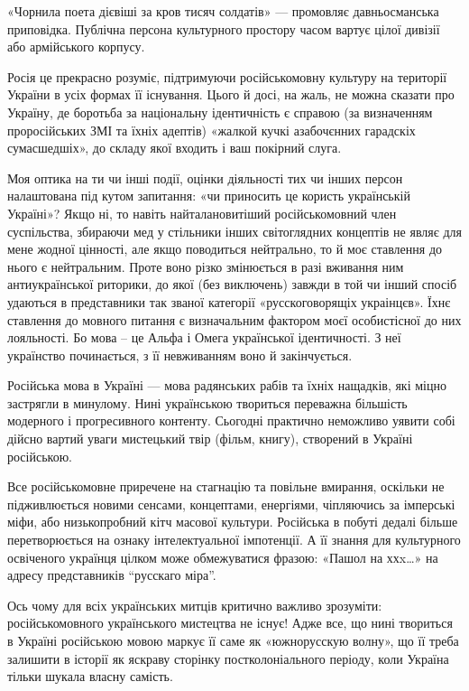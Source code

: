 «Чорнила поета дієвіші за кров тисяч солдатів» — промовляє давньосманська
приповідка. Публічна персона культурного простору часом вартує цілої дивізії
або армійського корпусу.

Росія це прекрасно розуміє, підтримуючи російськомовну культуру на території
України в усіх формах її існування. Цього й досі, на жаль, не можна сказати про
Україну, де боротьба за національну ідентичність є справою (за визначенням
проросійських ЗМІ та їхніх адептів) «жалкой кучкі азабочєнних гарадскіх
сумасшедшіх», до складу якої входить і ваш покірний слуга.

Моя оптика на ти чи інші події, оцінки діяльності тих чи інших персон
налаштована під кутом запитання: «чи приносить це користь українській Україні»?
Якщо ні, то навіть найталановитіший російськомовний член суспільства, збираючи
мед у стільники інших світоглядних концептів не являє для мене жодної цінності,
але якщо поводиться нейтрально, то й моє ставлення до нього є нейтральним.
Проте воно різко змінюється в разі  вживання ним антиукраїнської риторики, до
якої (без виключень) завжди в той чи інший спосіб  удаються в представники так
званої категорії «русскоговорящіх украінцєв». Їхнє  ставлення до мовного
питання є визначальним фактором моєї особистісної до них лояльності. Бо мова –
це Альфа і Омега української ідентичності. З неї українство починається, з її
невживанням воно й закінчується. 

Російська мова в Україні — мова радянських рабів та їхніх нащадків, які міцно
застрягли в минулому. Нині українською твориться переважна більшість модерного
і прогресивного контенту. Сьогодні практично неможливо уявити собі дійсно
вартий уваги мистецький твір (фільм, книгу), створений в Україні російською.

Все російськомовне приречене на стагнацію та повільне вмирання, оскільки не
підживлюється новими сенсами, концептами, енергіями, чіпляючись за імперські
міфи, або низькопробний кітч масової культури. Російська в побуті дедалі більше
перетворюється на ознаку інтелектуальної імпотенції. А її знання для
культурного освіченого українця цілком може обмежуватися фразою: «Пашол на
ххx…» на адресу представників \enquote{русскаго міра}.

Ось чому для всіх українських митців критично важливо зрозуміти:
російськомовного українського мистецтва не існує! Адже все, що нині твориться в
Україні російською мовою маркує її саме як «южнорусскую волну», що її треба
залишити в історії як яскраву сторінку постколоніального періоду, коли Україна
тільки шукала власну самість.

